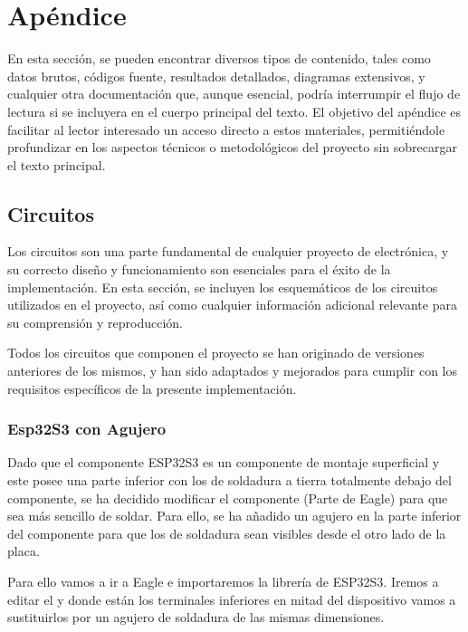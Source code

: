 \chapter{Apéndice}

En esta sección, se pueden encontrar diversos tipos de contenido, tales como datos brutos, códigos fuente, resultados detallados, diagramas extensivos, y cualquier otra documentación que, aunque esencial, podría interrumpir el flujo de lectura si se incluyera en el cuerpo principal del texto. El objetivo del apéndice es facilitar al lector interesado un acceso directo a estos materiales, permitiéndole profundizar en los aspectos técnicos o metodológicos del proyecto sin sobrecargar el texto principal.

\section{Circuitos}\label{ApendiceDiseñoEsquematico}

Los circuitos son una parte fundamental de cualquier proyecto de electrónica, y su correcto diseño y funcionamiento son esenciales para el éxito de la implementación. En esta sección, se incluyen los esquemáticos de los circuitos utilizados en el proyecto, así como cualquier información adicional relevante para su comprensión y reproducción.

Todos los circuitos que componen el proyecto se han originado de versiones anteriores de los mismos, y han sido adaptados y mejorados para cumplir con los requisitos específicos de la presente implementación.

\subsection{Esp32S3 con Agujero}\label{ApendiceEsp32Hole}
Dado que el componente ESP32S3 es un componente de montaje superficial y este posee una parte inferior con los  de soldadura a tierra totalmente debajo del componente, se ha decidido modificar el componente (Parte de Eagle) para que sea más sencillo de soldar. Para ello, se ha añadido un agujero en la parte inferior del componente para que los  de soldadura sean visibles desde el otro lado de la placa.

Para ello vamos a ir a Eagle e importaremos la librería de ESP32S3. Iremos a editar el  y donde están los terminales inferiores en mitad del dispositivo vamos a sustituirlos por un agujero de soldadura de las mismas dimensiones. 


